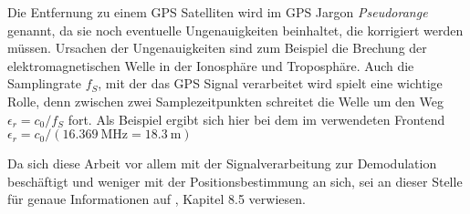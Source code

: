 Die Entfernung zu einem GPS Satelliten wird im GPS Jargon \emph{Pseudorange} genannt, da sie noch eventuelle Ungenauigkeiten beinhaltet, die korrigiert werden müssen. Ursachen der Ungenauigkeiten sind zum Beispiel die Brechung der elektromagnetischen Welle in der Ionosphäre und Troposphäre. Auch die Samplingrate $f_S$, mit der das GPS Signal verarbeitet wird spielt eine wichtige Rolle, denn zwischen zwei Samplezeitpunkten schreitet die Welle um den Weg $\epsilon_{r} = c_0/f_S$ fort. Als Beispiel ergibt sich hier bei dem im \dscubesat verwendeten Frontend $\epsilon_{r} = c_0/(\SI{16.369}{\MHz}=\SI{18.3}{\meter})$

Da sich diese Arbeit vor allem mit der Signalverarbeitung zur Demodulation beschäftigt und weniger mit der Positionsbestimmung an sich, sei an dieser Stelle für genaue Informationen auf \cite{borre2007software}, Kapitel 8.5 verwiesen.

